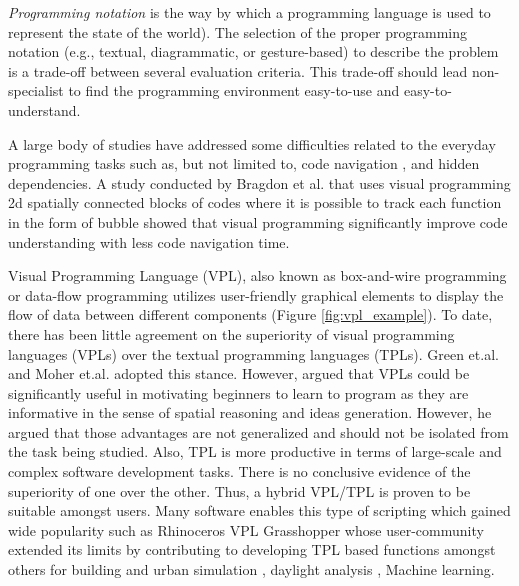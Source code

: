 \documentclass{scsSimAUDPaperFormat}
\begin{document}
\textit{Programming notation} is the way by which a programming language is used to represent the state of the world\cite{Green2004InstructionsDescriptions}). The selection of the proper programming notation (e.g., textual, diagrammatic, or gesture-based) to describe the problem is a trade-off between several evaluation criteria\cite{Green2004InstructionsDescriptions}. This trade-off should lead non-specialist to find the programming environment easy-to-use and easy-to-understand. 

A large body of studies have addressed some difficulties related to the everyday programming tasks such as, but not limited to, code navigation \cite{DeLine2006CodeCode}, and hidden dependencies. A study conducted by Bragdon et al. \cite{Bragdon2010CodeMaintenance} that uses visual programming 2d spatially connected blocks of codes where it is possible to track each function in the form of bubble showed that visual programming significantly improve code understanding with less code navigation time.

Visual Programming Language (VPL), also known as box-and-wire programming or data-flow programming utilizes user-friendly graphical elements to display the flow of data between different components (Figure \ref{fig:vpl_example}). To date, there has been little agreement on the superiority of visual programming languages (VPLs) over the textual programming languages (TPLs). Green et.al. \cite{Green1991ComprehensibilityConjecture} and Moher et.al. \cite{Moher1993ComparingPrograms} adopted this stance. However, \cite{MENZIES2002EVALUATIONLANGUAGES} argued that VPLs could be significantly useful in motivating beginners to learn to program as they are informative in the sense of spatial reasoning and ideas generation. However, he argued that those advantages are not generalized and should not be isolated from the task being studied. Also, TPL is more productive in terms of large-scale and complex software development tasks. There is no conclusive evidence of the superiority of one over the other. Thus, a hybrid VPL/TPL is proven to be suitable amongst users. Many software enables this type of scripting which gained wide popularity such as Rhinoceros VPL Grasshopper\cite{Bachman2017Grasshopper:3D,McNeel2010GrasshopperRhino} whose user-community extended its limits by contributing to developing TPL based functions amongst others for building and urban simulation \cite{RoudsariLadybug:Design, PeronatoIntegratingCitySim,Koltsova2011ComponentsGeometry}, daylight analysis \cite{Jakubiec2011DIVAEnergyPlus,Lagios2010AnimatedDaysim}, Machine learning\cite{Abdelrahman2017EnhancingLanguage,AbdelRahman2017GH_CPython:Grasshopper,Abdelrahman2019ANT:Development}.
\end{document}
